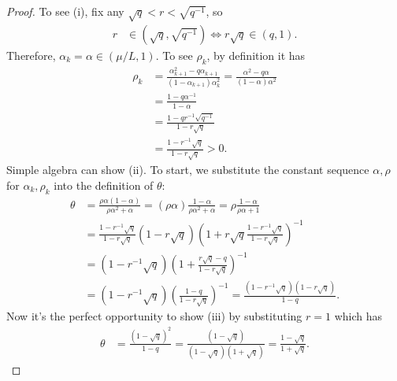 \documentclass[12pt]{article}
\begin{document}
    \begin{proof}
        To see (i), fix any $\sqrt{q} < r < \sqrt{q^{-1}}$, so
        \begin{align*}
            r &\in \left(\sqrt{q}, \sqrt{q^{-1}}\right)
            \iff
            r\sqrt{q} \in
            \left(
                q, 1
            \right).
        \end{align*}
        Therefore, $\alpha_k = \alpha \in (\mu/L, 1)$.
        To see $\rho_k$, by definition it has
        \begin{align*}
            \rho_k &= \frac{\alpha_{k + 1}^2 - q \alpha_{k + 1}}{(1 - \alpha_{k + 1})\alpha_k^2}
            = \frac{\alpha^2 - q \alpha}{(1 - \alpha)\alpha^2}
            \\
            &= \frac{1 - q\alpha^{-1}}{1 - \alpha}
            \\
            &= \frac{1 - q r^{-1}\sqrt{q^{-1}}}{1 - r \sqrt{q}}
            \\
            &= \frac{1 - r^{-1}\sqrt{q}}{1 - r \sqrt{q}} > 0.
        \end{align*}
        Simple algebra can show (ii).
        To start, we substitute the constant sequence $\alpha, \rho$ for $\alpha_k, \rho_k$ into the definition of $\theta$:
        \begin{align*}
            \theta &= \frac{\rho\alpha(1 - \alpha)}{\rho \alpha^2 + \alpha}
            = (\rho\alpha)\frac{1 - \alpha}{\rho \alpha^2 + \alpha} = \rho \frac{1 - \alpha}{\rho \alpha + 1}
            \\
            &=
            \frac{1 - r^{-1}\sqrt{q}}{1 - r \sqrt{q}}
            (1 - r\sqrt{q})
            \left(
                1 + r\sqrt{q}\frac{1 - r^{-1}\sqrt{q}}{1 - r \sqrt{q}}
            \right)^{-1}
            \\
            &= (1 - r^{-1} \sqrt{q})\left(
                1 + \frac{r \sqrt{q} - q}{1 - r \sqrt{q}}
            \right)^{-1}
            \\
            &= \left(1 - r^{-1} \sqrt{q}\right)\left(
                \frac{1 - q}{1 - r \sqrt{q}}
            \right)^{-1} = \frac{(1 - r^{-1}\sqrt{q})(1 - r \sqrt{q})}{1 - q}.
        \end{align*}
        Now it's the perfect opportunity to show (iii) by substituting $r = 1$ which has
        \begin{align*}
            \theta &= \frac{(1 - \sqrt{q})^2}{1 - q}
            =
            \frac{(1 - \sqrt{q})}{(1 - \sqrt{q})(1 + \sqrt{q})}
            = \frac{1 - \sqrt{q}}{1 + \sqrt{q}}.

\end{align*}
\end{proof}
\end{document}
